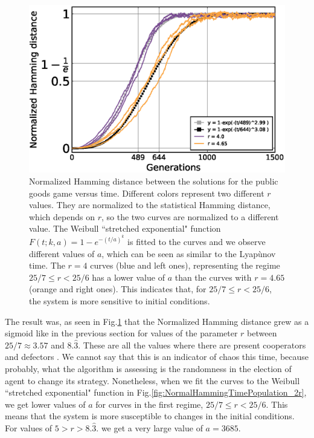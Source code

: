 \begin{figure}
	\centering
	\includegraphics[width=1\linewidth]{Images/P3/NormalHammingTimePopulation_2r.eps}
	\caption{Normalized Hamming distance between the solutions for the public goods game versus time. Different colors represent two different $r$ values. They are normalized to the statistical Hamming distance, which depends on $r$, so the two curves are normalized to a different value. The Weibull ``stretched exponential" function $F(t;k,a)=1-e^{-(t/a)^k}$ is fitted to the curves and we observe different values of $a$, which can be seen as similar to the Lyapùnov time. The $r=4$ curves (blue and left ones), representing the regime $25/7\leq r<25/6$ has a lower value of $a$ than the curves with $r=4.65$ (orange and right ones). This indicates that, for $25/7\leq r<25/6$, the system is more sensitive to initial conditions.}
	\label{fig:NormalHammingTimePopulation_r}
\end{figure}


The result was, as seen in Fig.\ref{fig:NormalHammingTimePopulation_r} that the Normalized Hamming distance grew as a sigmoid like in the previous section for values of the parameter $r$ between $25/7\approx3.57$ and $8.\hat3$. These are all the values where there are present cooperators and defectors . We cannot say that this is an indicator of chaos this time, because probably, what the algorithm is assessing is the randomness in the election of agent to change its strategy. Nonetheless, when we fit the curves to the Weibull ``stretched exponential" function in Fig.\ref{fig:NormalHammingTimePopulation_2r}, we get lower values of $a$ for curves in the first regime, $25/7\leq r<25/6$. This means that the system is more susceptible to changes in the initial conditions.   For values of $5>r>8.\hat3.$ we get a very large value of $a = 3685$.


